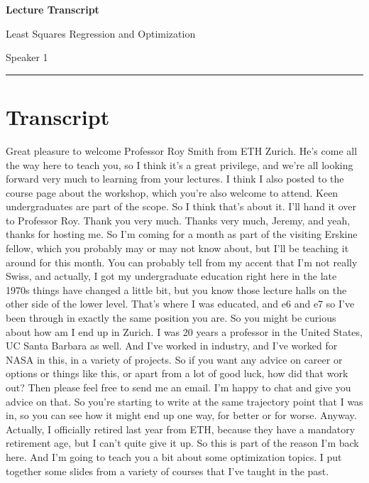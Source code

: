 \documentclass[11pt,a4paper]{article}
\begin{document}
\begin{center}
    {\LARGE\bfseries Lecture Transcript}\par
    \vspace{0.35em}
    {\large Least Squares Regression and Optimization}\par
    \vspace{0.6em}
    {\normalsize Speaker 1}\par
\end{center}

\vspace{0.5em}
\hrule
\vspace{1.2em}

\section*{Transcript}

Great pleasure to welcome Professor Roy Smith from ETH Zurich. He's come all the way here to teach you, so I think it's a great privilege, and we're all looking forward very much to learning from your lectures. I think I also posted to the course page about the workshop, which you're also welcome to attend. Keen undergraduates are part of the scope. So I think that's about it. I'll hand it over to Professor Roy. Thank you very much. Thanks very much, Jeremy, and yeah, thanks for hosting me. So I'm coming for a month as part of the visiting Erskine fellow, which you probably may or may not know about, but I'll be teaching it around for this month. You can probably tell from my accent that I'm not really Swiss, and actually, I got my undergraduate education right here in the late 1970s things have changed a little bit, but you know those lecture halls on the other side of the lower level. That's where I was educated, and e6 and e7 so I've been through in exactly the same position you are. So you might be curious about how am I end up in Zurich. I was 20 years a professor in the United States, UC Santa Barbara as well. And I've worked in industry, and I've worked for NASA in this, in a variety of projects. So if you want any advice on career or options or things like this, or apart from a lot of good luck, how did that work out? Then please feel free to send me an email. I'm happy to chat and give you advice on that. So you're starting to write at the same trajectory point that I was in, so you can see how it might end up one way, for better or for worse. Anyway. Actually, I officially retired last year from ETH, because they have a mandatory retirement age, but I can't quite give it up. So this is part of the reason I'm back here. And I'm going to teach you a bit about some optimization topics. I put together some slides from a variety of courses that I've taught in the past.
\end{document}
